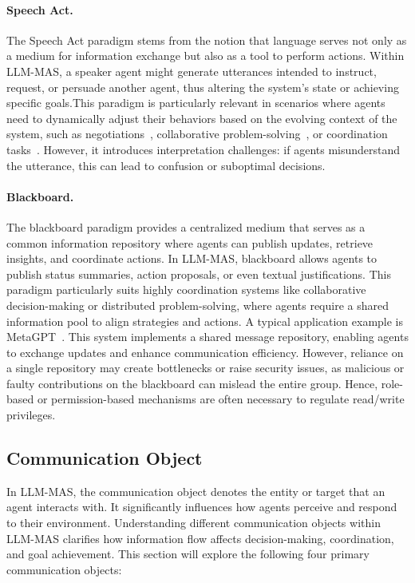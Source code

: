 \paragraph{Speech Act.} The Speech Act paradigm stems from the notion that language serves not only as a medium for information exchange but also as a tool to perform actions. Within LLM-MAS, a speaker agent might generate utterances intended to instruct, request, or persuade another agent, thus altering the system's state or achieving specific goals.This paradigm is particularly relevant in scenarios where agents need to dynamically adjust their behaviors based on the evolving context of the system, such as negotiations~\cite{polca_mas_for_political,richeliey_diplomacy_society}, collaborative problem-solving~\cite{debate_improve_llm_1}, or coordination tasks~\cite{chatdev_software_development}. However, it introduces interpretation challenges: if agents misunderstand the utterance, this can lead to confusion or suboptimal decisions. 


\paragraph{Blackboard.} The blackboard paradigm provides a centralized medium that serves as a common information repository where agents can publish updates, retrieve insights, and coordinate actions. In LLM-MAS,  blackboard allows agents to publish status summaries, action proposals, or even textual justifications. This paradigm particularly suits highly coordination systems like collaborative decision-making or distributed problem-solving, where agents require a shared information pool to align strategies and actions. A typical application example is MetaGPT~\cite{metagpt}. This system implements a shared message repository, enabling agents to exchange updates and enhance communication efficiency. However, reliance on a single repository may create bottlenecks or raise security issues, as malicious or faulty contributions on the blackboard can mislead the entire group. Hence, role-based or permission-based mechanisms are often necessary to regulate read/write privileges. 

\subsection{Communication Object}
In LLM-MAS, the communication object denotes the entity or target that an agent interacts with. It significantly influences how agents perceive and respond to their environment. Understanding different communication objects within LLM-MAS clarifies how information flow affects decision-making, coordination, and goal achievement. This section will explore the following four primary communication objects:

